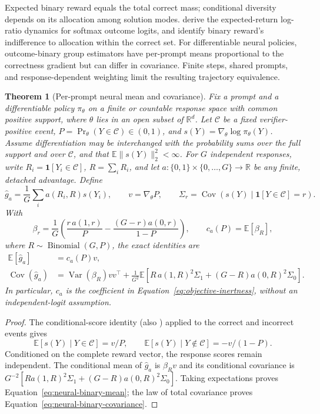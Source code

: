 \documentclass{article}
\newcommand{\enforcehalffinalproseline}{%
  \setlength{\parfillskip}{0pt plus .20\linewidth}}
\newcommand{\1}{\mathbf 1}
\newcommand{\E}{\mathbb E}
\newtheorem{theorem}[lemma]{Theorem}
\theoremstyle{remark}
\theoremstyle{definition}
\theoremstyle{plain}
\begin{document}
Expected binary reward equals the total correct mass; conditional diversity
depends on its allocation among solution modes.
\citet[Theorem~3.1, v1]{sinha2026expected} derive the expected-return
log-ratio dynamics for softmax outcome logits, and
\citet[Section~4.1, v1]{lochab2026ucpo} identify binary reward's
indifference to allocation within the correct set. For differentiable neural
policies, outcome-binary group estimators have per-prompt means proportional
to the correctness gradient but can differ in covariance. Finite steps,
shared prompts, and response-dependent weighting limit the resulting
trajectory equivalence.

\begin{theorem}[Per-prompt neural mean and covariance]
\enforcehalffinalproseline
\label{thm:neural-binary-moments}
Fix a prompt and a differentiable policy $\pi_\theta$ on a finite or countable
response space with common positive support, where $\theta$ lies in an open
subset of $\mathbb R^d$. Let $\mathcal C$ be a fixed verifier-positive event,
$P=\Pr_\theta(Y\in\mathcal C)\in(0,1)$, and
$s(Y)=\nabla_\theta\log\pi_\theta(Y)$. Assume differentiation may be
interchanged with the probability sums over the full support and over
$\mathcal C$, and that $\E\|s(Y)\|_2^2<\infty$. For $G$ independent
responses, write $R_i=\1[Y_i\in\mathcal C]$, $R=\sum_iR_i$, and let
$a:\{0,1\}\times\{0,\ldots,G\}\to\mathbb R$ be any finite, detached
advantage. Define
\[
 \widehat g_a=\frac1G\sum_i a(R_i,R)s(Y_i),\qquad
 v=\nabla_\theta P,\qquad
 \Sigma_r=\operatorname{Cov}\!\left(s(Y)\mid\1[Y\in\mathcal C]=r\right).
\]
With
\[
 \beta_r=\frac1G\left(\frac{r\,a(1,r)}P
          -\frac{(G-r)a(0,r)}{1-P}\right),
 \qquad c_a(P)=\E[\beta_R],
\]
where $R\sim\operatorname{Binomial}(G,P)$, the exact identities are
\begin{align}
 \E[\widehat g_a]&=c_a(P)v,
 \label{eq:neural-binary-mean}\\
 \operatorname{Cov}(\widehat g_a)
 &=\operatorname{Var}(\beta_R)vv^\top
   +\frac1{G^2}\E\!\left[
       R\,a(1,R)^2\Sigma_1+(G-R)a(0,R)^2\Sigma_0\right].
 \label{eq:neural-binary-covariance}
\end{align}
In particular, $c_a$ is the coefficient in
Equation~\eqref{eq:objective-inertness}, without an independent-logit
assumption.
\end{theorem}

\begin{proof}
\enforcehalffinalproseline
The conditional-score identity
\citep[Theorem~1]{tajwar2026maxrl} (also
\citealp[Lemma~B.1]{avspo2026}) applied to the correct and incorrect events gives
\[
 \E[s(Y)\mid Y\in\mathcal C]=v/P,
 \qquad
 \E[s(Y)\mid Y\notin\mathcal C]=-v/(1-P).
\]
Conditioned on the complete reward vector, the response scores remain
independent. The conditional mean of $\widehat g_a$ is $\beta_Rv$ and
its conditional covariance is
$G^{-2}[R a(1,R)^2\Sigma_1+(G-R)a(0,R)^2\Sigma_0]$.
Taking expectations proves Equation~\eqref{eq:neural-binary-mean}; the law
of total covariance proves Equation~\eqref{eq:neural-binary-covariance}.
\end{proof}
\end{document}

